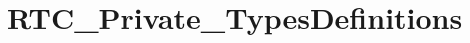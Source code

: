 \hypertarget{group___r_t_c___private___types_definitions}{}\section{R\+T\+C\+\_\+\+Private\+\_\+\+Types\+Definitions}
\label{group___r_t_c___private___types_definitions}
